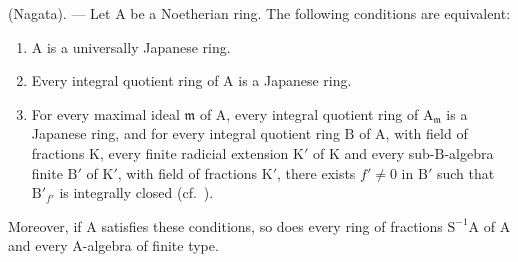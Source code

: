 \begin{theorem}[7.7.2]
\label{IV.7.7.2}
(Nagata). --- Let $\mathrm{A}$ be a Noetherian ring. The following conditions are equivalent:
\begin{enumerate}[label=\emph{\alph*)}]
  \item $\mathrm{A}$ is a universally Japanese ring.
  \item Every integral quotient ring of $\mathrm{A}$ is a Japanese ring.
  \item For every maximal ideal $\mathfrak{m}$ of $\mathrm{A}$, every integral quotient ring of $\mathrm{A}_\mathfrak{m}$ is a Japanese ring, and for every integral quotient ring $\mathrm{B}$ of $\mathrm{A}$, with field of fractions $\mathrm{K}$, every finite radicial extension $\mathrm{K}'$ of $\mathrm{K}$ and every sub-$\mathrm{B}$-algebra finite $\mathrm{B}'$ of $\mathrm{K}'$, with field of fractions $\mathrm{K}'$, there exists $f'\neq 0$ in $\mathrm{B}'$ such that $\mathrm{B}'_{f'}$ is integrally closed (cf.\ ).
\end{enumerate}
Moreover, if $\mathrm{A}$ satisfies these conditions, so does every ring of fractions $\mathrm{S}^{-1}\mathrm{A}$ of $\mathrm{A}$ and every $\mathrm{A}$-algebra of finite type.
\end{theorem}

